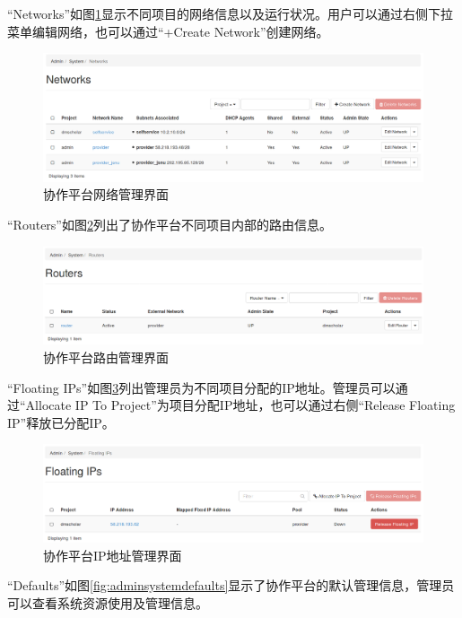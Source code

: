 \documentclass[12pt]{article}
\begin{document}
``Networks''如图\ref{fig:adminsystemnetworks}显示不同项目的网络信息以及运行状况。用户可以通过右侧下拉菜单编辑网络，也可以通过``+Create Network''创建网络。
\begin{figure}[!htb]
\centering
\includegraphics[width=6in]{./figures/Admin_System_Networks}
\caption{协作平台网络管理界面}
\label{fig:adminsystemnetworks}
\end{figure}
``Routers''如图\ref{fig:adminsystemrouters}列出了协作平台不同项目内部的路由信息。
\begin{figure}[!htb]
\centering
\includegraphics[width=6in]{./figures/Admin_System_Routers}
\caption{协作平台路由管理界面}
\label{fig:adminsystemrouters}
\end{figure}
``Floating IPs''如图\ref{fig:adminsystemfloatingip}列出管理员为不同项目分配的IP地址。管理员可以通过``Allocate IP To Project''为项目分配IP地址，也可以通过右侧``Release Floating IP''释放已分配IP。
\begin{figure}[!htb]
\centering
\includegraphics[width=6in]{./figures/Admin_System_FloatingIP}
\caption{协作平台IP地址管理界面}
\label{fig:adminsystemfloatingip}
\end{figure}
``Defaults''如图\ref{fig:adminsystemdefaults}显示了协作平台的默认管理信息，管理员可以查看系统资源使用及管理信息。
\end{document}
